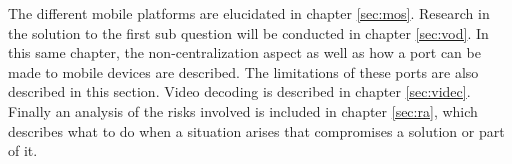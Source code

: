 The different mobile platforms are elucidated in chapter \ref{sec:mos}. Research in the solution to the first sub question will be conducted in chapter \ref{sec:vod}. In this same chapter, the non-centralization aspect as well as how a port can be made to mobile devices are described. The limitations of these ports are also described in this section. Video decoding is described in chapter \ref{sec:videc}. Finally an analysis of the risks involved is included in chapter \ref{sec:ra}, which describes what to do when a situation arises that compromises a solution or part of it.